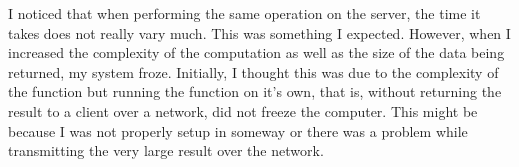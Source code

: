 \documentclass{article}
\begin{document}
I noticed that when  performing the same operation on the server, the time it takes does not really vary much. This was something I expected. However, when I increased the complexity of the computation as well as the size of the data being returned, my system froze. Initially, I thought this was due to the complexity of the function but running the function on it's own, that is, without returning the result to a client over a network, did not freeze the computer. This might be because I was not properly setup in someway or there was a problem while transmitting the very large result over the network. 
\end{document}
